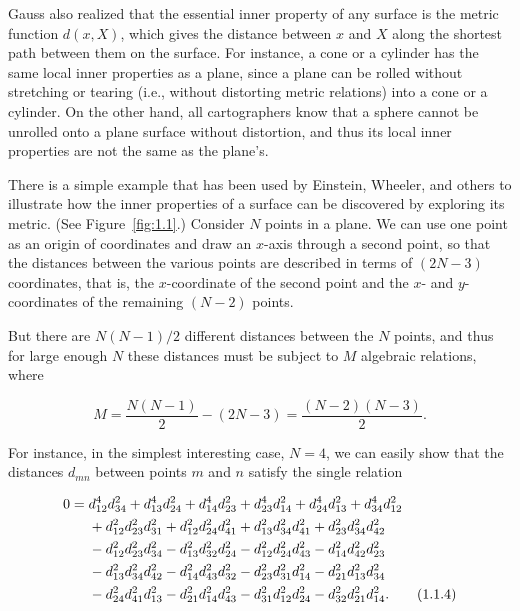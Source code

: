 Gauss also realized that the essential inner property of any surface is the
metric function \(d(x,X)\), which gives the distance between \(x\) and \(X\)
along the shortest path between them on the surface. For instance, a cone or a
cylinder has the same local inner properties as a plane, since a plane can be
rolled without stretching or tearing (i.e., without distorting metric
relations) into a cone or a cylinder. On the other hand, all cartographers know
that a sphere cannot be unrolled onto a plane surface without distortion, and
thus its local inner properties are not the same as the plane's.

There is a simple example that has been used by Einstein, Wheeler, and others
to illustrate how the inner properties of a surface can be discovered by
exploring its metric. (See Figure~\ref{fig:1.1}.) Consider \(N\) points in a
plane. We can use one point as an origin of coordinates and draw an \(x\)-axis
through a second point, so that the distances between the various points are
described in terms of \((2N-3)\) coordinates, that is, the \(x\)-coordinate of
the second point and the \(x\)- and \(y\)-coordinates of the remaining
\((N-2)\) points.



But there are \(N(N-1)/2\) different distances between the \(N\) points, and
thus for large enough \(N\) these distances must be subject to \(M\) algebraic
relations, where

\begin{equation}
  M=\frac{N(N-1)}{2}-(2N-3)=\frac{(N-2)(N-3)}{2}.
  \tag{1.1.3}\label{eq:1.1.3}
\end{equation}

For instance, in the simplest interesting case, \(N=4\), we can easily show
that the distances \(d_{mn}\) between points \(m\) and \(n\) satisfy the single
relation

\begin{align}
0={}&d_{12}^{4}d_{34}^{2}+d_{13}^{4}d_{24}^{2}
  +d_{14}^{4}d_{23}^{2}+d_{23}^{4}d_{14}^{2}
  +d_{24}^{4}d_{13}^{2}+d_{34}^{4}d_{12}^{2}\notag\\
 &+d_{12}^{2}d_{23}^{2}d_{31}^{2}
  +d_{12}^{2}d_{24}^{2}d_{41}^{2}
  +d_{13}^{2}d_{34}^{2}d_{41}^{2}
  +d_{23}^{2}d_{34}^{2}d_{42}^{2}\notag\\
 &-d_{12}^{2}d_{23}^{2}d_{34}^{2}
  -d_{13}^{2}d_{32}^{2}d_{24}^{2}
  -d_{12}^{2}d_{24}^{2}d_{43}^{2}
  -d_{14}^{2}d_{42}^{2}d_{23}^{2}\notag\\
 &-d_{13}^{2}d_{34}^{2}d_{42}^{2}
  -d_{14}^{2}d_{43}^{2}d_{32}^{2}
  -d_{23}^{2}d_{31}^{2}d_{14}^{2}
  -d_{21}^{2}d_{13}^{2}d_{34}^{2}\notag\\
 &-d_{24}^{2}d_{41}^{2}d_{13}^{2}
  -d_{21}^{2}d_{14}^{2}d_{43}^{2}
  -d_{31}^{2}d_{12}^{2}d_{24}^{2}
  -d_{32}^{2}d_{21}^{2}d_{14}^{2}.
  \tag{1.1.4}\label{eq:1.1.4}
\end{align}

